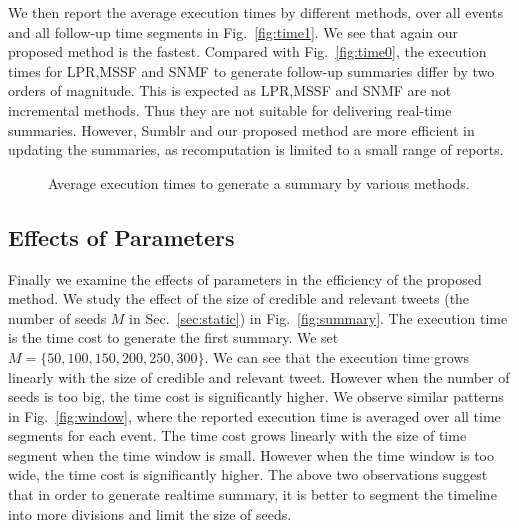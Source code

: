 \documentclass[envcountsame]{llncs}
\begin{document}
We then report the average execution times by different methods, over all events and all follow-up time segments in Fig.~\ref{fig:time1}. We see that again our proposed method is the fastest. Compared with Fig.~\ref{fig:time0}, the execution times for LPR,MSSF and SNMF to generate follow-up summaries differ by two orders of magnitude. This is expected as LPR,MSSF and SNMF are not incremental methods. Thus they are not suitable for delivering real-time summaries. However, Sumblr and our proposed method are more efficient in updating the summaries, as recomputation is limited to a small range of reports.

\begin{figure}
\centering
{}
\hspace{-4ex}
\setlength{\abovecaptionskip}{-0.1cm}
\caption{Average execution times to generate a summary by various methods. }
\end{figure}

\subsection{Effects of Parameters}

Finally we examine the effects of parameters in the efficiency of the proposed method. We study the effect of the size of credible and relevant tweets (the number of seeds $M$ in Sec.~\ref{sec:static}) in Fig.~\ref{fig:summary}. The execution time is the time cost to generate the first summary. We set $M=\{50,100,150,200,250,300\}$. We can see that the execution time grows linearly with the size of credible and relevant tweet. However when the number of seeds is too big, the time cost is significantly higher. We observe similar patterns in Fig.~\ref{fig:window}, where the reported execution time is averaged  over all time segments for each event. The time cost grows linearly with the size of time segment when the time window is small. However when the time window is too wide, the time cost is significantly higher. The above two observations suggest that in order to generate realtime summary, it is better to segment the timeline into more divisions and limit the size of seeds.
\end{document}
